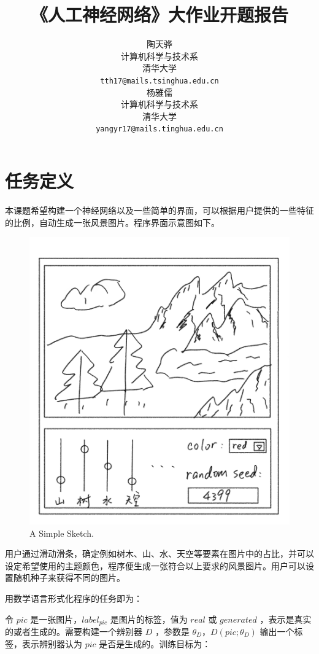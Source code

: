 \documentclass{article}
\title{《人工神经网络》大作业开题报告}
\author{
  陶天骅\\
  计算机科学与技术系 \\
  清华大学 \\
  \texttt{tth17@mails.tsinghua.edu.cn} \\
  \AND
  杨雅儒\\
  计算机科学与技术系 \\
  清华大学 \\
  \texttt{yangyr17@mails.tinghua.edu.cn} \\
}
\begin{document}

\maketitle



\section{任务定义}

本课题希望构建一个神经网络以及一些简单的界面，可以根据用户提供的一些特征的比例，自动生成一张风景图片。程序界面示意图如下。

\begin{figure}[ht]
	\centering
	\includegraphics[scale=0.1]{res/sketch.png}
	\caption{A Simple Sketch.}
\end{figure}

用户通过滑动滑条，确定例如树木、山、水、天空等要素在图片中的占比，并可以设定希望使用的主题颜色，程序便生成一张符合以上要求的风景图片。用户可以设置随机种子来获得不同的图片。

用数学语言形式化程序的任务即为：

令 $pic$ 是一张图片，$label_{pic}$ 是图片的标签，值为 $real$ 或 $generated$ ，表示是真实的或者生成的。需要构建一个辨别器 $D$ ，参数是 $\theta_D$，$D(pic; \theta_D)$ 输出一个标签，表示辨别器认为 $pic$ 是否是生成的。训练目标为：
\end{document}
